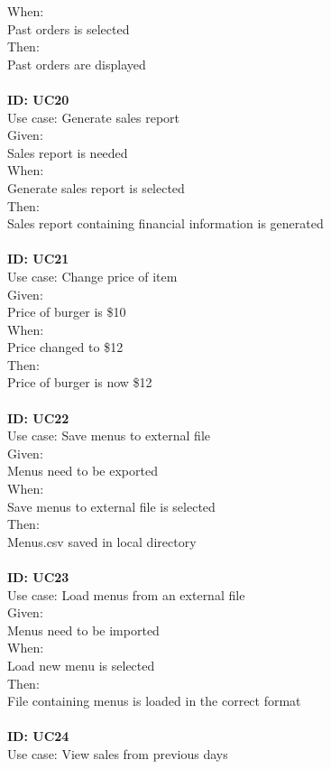 When: \\
Past orders is selected\\
Then:\\
Past orders are displayed\\
\\
\textbf{ID: UC20\\}
Use case: Generate sales report\\
Given: \\
Sales report is needed\\
When: \\
Generate sales report is selected\\
Then:\\
Sales report containing financial information is generated\\
\\
\textbf{ID: UC21\\}
Use case: Change price of item\\
Given: \\
Price of burger is \$10\\
When: \\
Price changed to \$12\\
Then:\\
Price of burger is now \$12\\
\\
\textbf{ID: UC22\\}
Use case: Save menus to external file\\
Given: \\
Menus need to be exported\\
When: \\
Save menus to external file is selected\\
Then:\\
Menus.csv saved in local directory\\
\\
\textbf{ID: UC23\\}
Use case: Load menus from an external file\\
Given: \\
Menus need to be imported\\
When: \\
Load new menu is selected\\
Then:\\
File containing menus is loaded in the correct format\\
\\
\textbf{ID: UC24\\}
Use case: View sales from previous days\\
